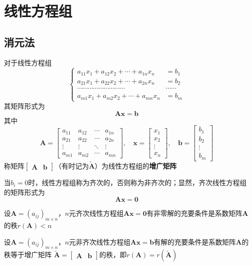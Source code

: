 \documentclass[UTF8]{ctexart}
\newcommand{\ve}[1]{{\bm{#1}}}
\newcommand{\mat}[1]{\ve{#1}}
\newcommand{\emplin}{\vspace{1em}}
\begin{document}
\section*{线性方程组}
\subsection*{消元法}
对于线性方程组
\[\left\{
\begin{aligned}
a_{11}x_1+a_{12}x_2+\cdots+a_{1n}x_n&=b_1\\
a_{21}x_1+a_{22}x_2+\cdots+a_{2n}x_n&=b_2\\
\cdots\cdots\cdots\cdots\cdots\cdots\cdots\cdots\cdots&\cdots\cdots\\
a_{m1}x_1+a_{m2}x_2+\cdots+a_{mn}x_n&=b_m
\end{aligned}
\right.\]
其矩阵形式为
\[\mat{A}\mat{x}=\mat{b}\]
其中
\[\displaystyle\mat{A}=\begin{bmatrix}
a_{11}&a_{12}&\cdots&a_{1n}\\
a_{21}&a_{22}&\cdots&a_{2n}\\
\vdots&\vdots&\ddots&\vdots\\
a_{m1}&a_{m2}&\cdots&a_{mn}
\end{bmatrix},\quad
\displaystyle\mat{x}=\begin{bmatrix}
x_1\\
x_2\\
\vdots\\
x_n
\end{bmatrix},\quad
\displaystyle\mat{b}=\begin{bmatrix}
b_1\\
b_2\\
\vdots\\
b_m
\end{bmatrix}\]
称矩阵$\displaystyle\begin{bmatrix}\mat{A}&\mat{b}\end{bmatrix}$（有时记为$\widetilde{\mat{A}}$）为线性方程组的\textbf{增广矩阵}

当$b_i=0$时，线性方程组称为齐次的，否则称为非齐次的；显然，齐次线性方程组的矩阵形式为
\[\mat{A}\mat{x}=\mat{0}\]

\emplin
\emplin

设$\mat{A}=(a_{ij})_{m\times n}$，$n$元齐次线性方程组$\mat{A}\mat{x}=\mat{0}$有非零解的充要条件是系数矩阵$\mat{A}$的秩$r(\mat{A})<n$

\emplin

设$\mat{A}=(a_{ij})_{m\times n}$，$n$元非齐次线性方程组$\mat{A}\mat{x}=\mat{b}$有解的充要条件是系数矩阵$\mat{A}$的秩等于增广矩阵
$\widetilde{\mat{A}}=\begin{bmatrix}\mat{A}&\mat{b}\end{bmatrix}$的秩，即$r(\mat{A})=r(\widetilde{\mat{A}})$
\end{document}
